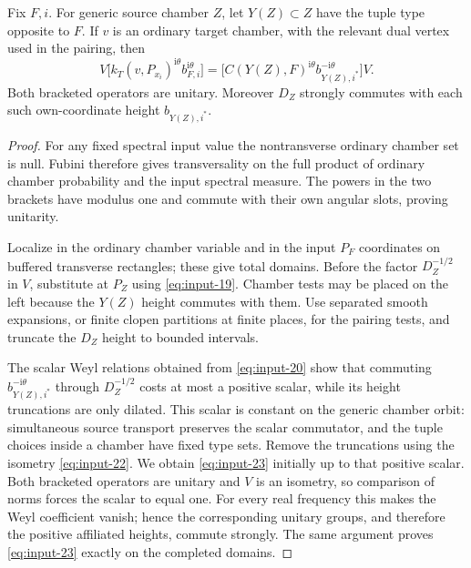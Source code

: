 \begin{proposition}
\label{prop:heights-intertwiner}
Fix $F,i$.  For generic source chamber $Z$, let $Y(Z)\subset Z$ have the
tuple type opposite to $F$.  If $v$ is an ordinary target chamber, with
the relevant dual vertex used in the pairing, then
\begin{equation}\label{eq:input-23}
 V\bigl[k_T(v,P_{x_i})^{\mathrm i\theta}
              b_{F,i}^{\mathrm i\theta}\bigr]
 =\bigl[C(Y(Z),F)^{\mathrm i\theta}
              b_{Y(Z),i^*}^{-\mathrm i\theta}\bigr]V.
\end{equation}
Both bracketed operators are unitary.  Moreover $D_Z$ strongly commutes
with each such own-coordinate height $b_{Y(Z),i^*}$.
\end{proposition}

\begin{proof}
For any fixed spectral input value the nontransverse ordinary chamber set
is null.  Fubini therefore gives transversality on the full product of
ordinary chamber probability and the input spectral measure.  The powers
in the two brackets have modulus one and commute with their own angular
slots, proving unitarity.

Localize in the ordinary chamber variable and in the input $P_F$
coordinates on buffered transverse rectangles; these give total domains.
Before the factor $D_Z^{-1/2}$ in $V$, substitute at $P_Z$ using
\eqref{eq:input-19}.  Chamber tests may be placed on the left because the
$Y(Z)$ height commutes with them.  Use separated smooth expansions, or
finite clopen partitions at finite places, for the pairing tests, and
truncate the $D_Z$ height to bounded intervals.

The scalar Weyl relations obtained from \eqref{eq:input-20} show that
commuting $b_{Y(Z),i^*}^{-\mathrm i\theta}$ through $D_Z^{-1/2}$ costs at
most a positive scalar, while its height truncations are only dilated.
This scalar is constant on the generic chamber orbit: simultaneous source
transport preserves the scalar commutator, and the tuple choices inside
a chamber have fixed type sets.  Remove the truncations using the
isometry \eqref{eq:input-22}.  We obtain \eqref{eq:input-23} initially up
to that positive scalar.  Both bracketed operators are unitary and $V$
is an isometry, so comparison of norms forces the scalar to equal one.
For every real frequency this makes the Weyl coefficient vanish; hence
the corresponding unitary groups, and therefore the positive affiliated
heights, commute strongly.  The same argument proves
\eqref{eq:input-23} exactly on the completed domains.
\end{proof}
